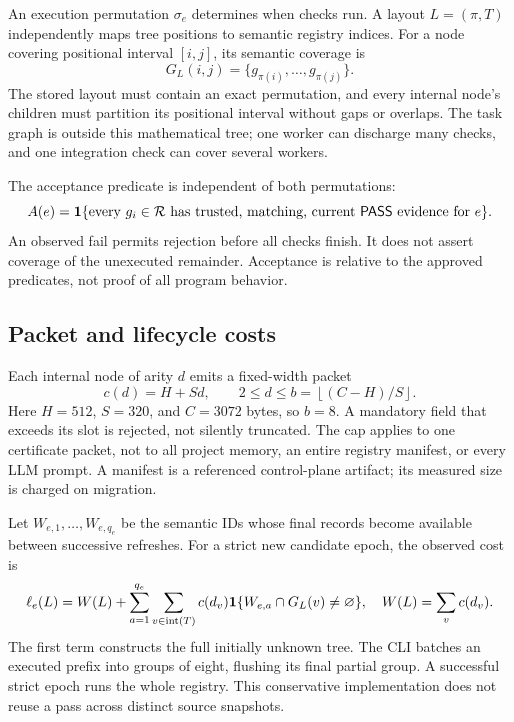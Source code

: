 \documentclass[11pt]{article}
\theoremstyle{definition}\newtheorem{definition}[theorem]{Definition}
\newcommand{\PASS}{\mathsf{PASS}}\newcommand{\FAIL}{\mathsf{FAIL}}\newcommand{\UNKNOWN}{\mathsf{UNKNOWN}}
\begin{document}
An execution permutation $\sigma_e$ determines when checks run. A layout $L=(\pi,T)$ independently maps tree positions to semantic registry indices. For a node covering positional interval $[i,j]$, its semantic coverage is
\begin{equation}
 G_L(i,j)=\{g_{\pi(i)},\ldots,g_{\pi(j)}\}.
\end{equation}
The stored layout must contain an exact permutation, and every internal node's children must partition its positional interval without gaps or overlaps. The task graph is outside this mathematical tree; one worker can discharge many checks, and one integration check can cover several workers.

The acceptance predicate is independent of both permutations:
\begin{equation}\label{eq:accept}
 A(e)=\ind\{\text{every }g_i\in\R\text{ has trusted, matching, current }\PASS\text{ evidence for }e\}.
\end{equation}
An observed fail permits rejection before all checks finish. It does not assert coverage of the unexecuted remainder. Acceptance is relative to the approved predicates, not proof of all program behavior.

\subsection{Packet and lifecycle costs}
Each internal node of arity $d$ emits a fixed-width packet
\begin{equation}\label{eq:packet}
 c(d)=H+Sd,\qquad 2\le d\le b=\left\lfloor(C-H)/S\right\rfloor.
\end{equation}
Here $H=512$, $S=320$, and $C=3072$ bytes, so $b=8$. A mandatory field that exceeds its slot is rejected, not silently truncated. The cap applies to one certificate packet, not to all project memory, an entire registry manifest, or every LLM prompt. A manifest is a referenced control-plane artifact; its measured size is charged on migration.

Let $W_{e,1},\ldots,W_{e,q_e}$ be the semantic IDs whose final records become available between successive refreshes. For a strict new candidate epoch, the observed cost is
\begin{equation}\label{eq:strict}
 \ell_e(L)=W(L)+\sum_{a=1}^{q_e}\sum_{v\in\operatorname{int}(T)}
 c(d_v)\mathbf 1\{W_{e,a}\cap G_L(v)\ne\varnothing\},\quad
 W(L)=\sum_v c(d_v).
\end{equation}
The first term constructs the full initially unknown tree. The CLI batches an executed prefix into groups of eight, flushing its final partial group. A successful strict epoch runs the whole registry. This conservative implementation does not reuse a pass across distinct source snapshots.
\end{document}
